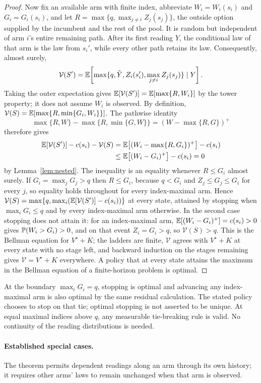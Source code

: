 \begin{proof}
Now fix an available arm with finite index, abbreviate $W_i=W_i(s_i)$ and $G_i=G_i(s_i)$, and
let $R=\max\{q,\max_{j\ne i}Z_j(s_j)\}$, the outside option supplied by the incumbent
and the rest of the pool. It is random but independent of arm $i$'s entire remaining path.
After its first reading $Y$, the conditional law of that arm is the law from
$s_i'$, while every other path retains its law. Consequently, almost surely,
\[
\mathcal V(S')=\mathbb{E}\!\left[\max\{q,\tilde Y,Z_i(s_i'),\max_{j\ne i}Z_j(s_j)\}\mid Y\right].
\]
Taking the outer expectation gives $\mathbb{E}[\mathcal V(S')]=\mathbb{E}[\max\{R,W_i\}]$ by the tower
property; it does not assume $W_i$ is observed. By definition,
$\mathcal V(S)=\mathbb{E}[\max\{R,\min\{G_i,W_i\}\}]$. The pathwise identity
\[
\max\{R,W\}-\max\{R,\min\{G,W\}\}=(W-\max\{R,G\})^+
\]
therefore gives
\begin{align*}
\mathbb{E}[\mathcal V(S')]-c(s_i)-\mathcal V(S)
&=\mathbb{E}\bigl[(W_i-\max\{R,G_i\})^+\bigr]-c(s_i)\\
&\le\mathbb{E}\bigl[(W_i-G_i)^+\bigr]-c(s_i)=0
\end{align*}
by Lemma~\ref{lem:nested}. The inequality is an
equality whenever $R\le G_i$ almost surely. If $G_i=\max_j G_j>q$ then $R\le G_i$, because
$q<G_i$ and $Z_j\le G_j\le G_i$ for every $j$, so equality holds throughout for every
index-maximal arm. Hence $\mathcal V(S)=\max\{q,\max_i(\mathbb{E}[\mathcal V(S')]-c(s_i))\}$ at every state, attained by
stopping when $\max_i G_i\le q$ and by every index-maximal arm otherwise. In the second case
stopping does not attain it: for an index-maximal arm, $\mathbb{E}[(W_i-G_i)^+]=c(s_i)>0$ gives
$\mathbb{P}(W_i>G_i)>0$, and on that event $Z_i=G_i>q$, so $\mathcal V(S)>q$. This is the Bellman equation for
$V^\star+K$; the ladders are finite, $\mathcal V$ agrees with $V^\star+K$ at every state with no stage
left, and backward induction on the stages remaining gives $\mathcal V=V^\star+K$ everywhere. A policy that
at every state attains the maximum in the Bellman equation of a finite-horizon problem is optimal.
\end{proof}

At the boundary $\max_iG_i=q$, stopping is optimal and advancing any index-maximal arm is
also optimal by the same residual calculation. The stated policy chooses to stop on that
tie; optimal stopping is not asserted to be unique. At equal maximal indices above $q$, any
measurable tie-breaking rule is valid. No continuity of the reading distributions is needed.



\paragraph{Established special cases.}
The theorem permits dependent readings along an arm through its own history; it requires
other arms' laws to remain unchanged when that arm is observed.

